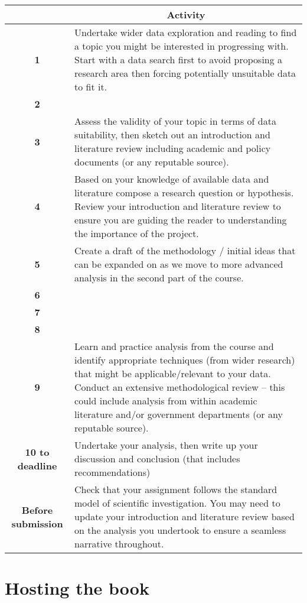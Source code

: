 \documentclass[
  12pt,
  oneside]{book}
\begin{document}
\begin{table}[H]
\centering
\begin{tabular}[middle]{>{\bfseries}c||l}
\hline
\multicolumn{1}{c}{Week} & \multicolumn{1}{c}{Activity}\\
\hline
1 & Undertake wider data exploration and reading to find a topic you might be interested in progressing with. Start with a data search first to avoid proposing a research area then forcing potentially unsuitable data to fit it.\\
\cline{1-2}
2 & \\
\cline{1-1}
3 & \multirow{-2}{*}{\raggedright\arraybackslash Assess the validity of your topic in terms of data suitability, then sketch out an introduction and literature review including academic and policy documents (or any reputable source).}\\
\cline{1-2}
4 & Based on your knowledge of available data and literature compose a research question or hypothesis. Review your introduction and literature review to ensure you are guiding the reader to understanding the importance of the project.\\
\cline{1-2}
5 & Create a draft of the methodology / initial ideas that can be expanded on as we move to more advanced analysis in the second part of the course.\\
\cline{1-2}
6 & \\
\cline{1-1}
7 & \\
\cline{1-1}
8 & \\
\cline{1-1}
9 & \multirow{-4}{*}{\raggedright\arraybackslash Learn and practice analysis from the course and identify appropriate techniques (from wider research) that might be applicable/relevant to your data. Conduct an extensive methodological review – this could include analysis from within academic literature and/or government departments (or any reputable source).}\\
\cline{1-2}
10 to deadline & Undertake your analysis, then write up your discussion and conclusion (that includes recommendations)\\
\cline{1-2}
Before submission & Check that your assignment follows the standard model of scientific investigation. You may need to update your introduction and literature review based on the analysis you undertook to ensure a seamless narrative throughout.\\
\hline
\end{tabular}
\end{table}

\hypertarget{hosting-the-book}{%
\section{Hosting the book}\label{hosting-the-book}}
\end{document}
